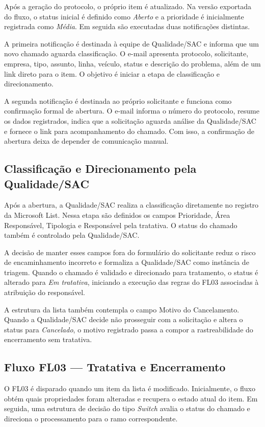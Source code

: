 Após a geração do protocolo, o próprio item é atualizado.
Na versão exportada do fluxo, o status inicial é definido
como \textit{Aberto} e a prioridade é inicialmente
registrada como \textit{Média}. Em seguida são executadas
duas notificações distintas.

A primeira notificação é destinada à equipe de
Qualidade/SAC e informa que um novo chamado aguarda
classificação. O e-mail apresenta protocolo, solicitante,
empresa, tipo, assunto, linha, veículo, status e descrição
do problema, além de um link direto para o item. O objetivo
é iniciar a etapa de classificação e direcionamento.

A segunda notificação é destinada ao próprio solicitante e
funciona como confirmação formal de abertura. O e-mail
informa o número do protocolo, resume os dados registrados,
indica que a solicitação aguarda análise da Qualidade/SAC e
fornece o link para acompanhamento do chamado. Com isso, a
confirmação de abertura deixa de depender de comunicação
manual.

\subsection{Classificação e Direcionamento pela
Qualidade/SAC}

Após a abertura, a Qualidade/SAC realiza a classificação
diretamente no registro da Microsoft List. Nessa etapa são
definidos os campos Prioridade, Área Responsável, Tipologia
e Responsável pela tratativa. O status do chamado também é
controlado pela Qualidade/SAC.

A decisão de manter esses campos fora do formulário do
solicitante reduz o risco de encaminhamento incorreto e
formaliza a Qualidade/SAC como instância de triagem. Quando
o chamado é validado e direcionado para tratamento, o
status é alterado para \textit{Em tratativa}, iniciando a
execução das regras do FL03 associadas à atribuição do
responsável.

A estrutura da lista também contempla o campo Motivo do
Cancelamento. Quando a Qualidade/SAC decide não prosseguir
com a solicitação e altera o status para
\textit{Cancelado}, o motivo registrado passa a compor a
rastreabilidade do encerramento sem tratativa.

\subsection{Fluxo FL03 --- Tratativa e Encerramento}

O FL03 é disparado quando um item da lista é modificado.
Inicialmente, o fluxo obtém quais propriedades foram
alteradas e recupera o estado atual do item. Em seguida,
uma estrutura de decisão do tipo \textit{Switch} avalia o
status do chamado e direciona o processamento para o ramo
correspondente.

